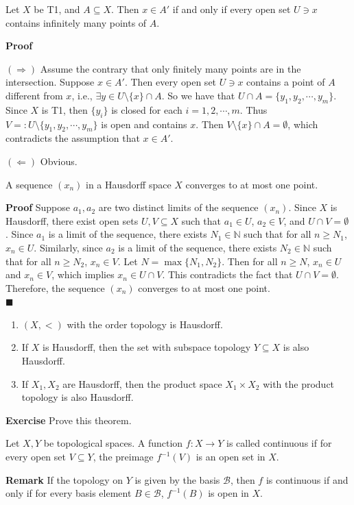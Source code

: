 \documentclass[main.tex]{subfiles}
\begin{document}
\begin{theorem}
    Let $X$ be T1, and $A \subseteq X$. Then $x \in A'$ if and only if every open set $U \ni x$ contains infinitely many points of $A$.
\end{theorem}
\par \noindent \textbf{Proof} 
\par $(\Rightarrow)$ Assume the contrary that only finitely many points are in the intersection. Suppose $x \in A'$. Then every open set $U \ni x$ contains a point of $A$ different from $x$, i.e., $\exists y\in U\setminus \{x\} \cap A$. So we have that $U\cap A = \{y_1, y_2, \cdots, y_m\}$. Since $X$ is T1, then $\{y_i\}$ is closed for each $i = 1, 2, \cdots, m$. Thus $V=:U \setminus \{y_1, y_2, \cdots, y_m\}$ is open and contains $x$. Then $V\setminus \{x\} \cap A = \emptyset$, which contradicts the assumption that $x \in A'$. 
\par $(\Leftarrow)$ Obvious.

\begin{theorem}
    A sequence $(x_n)$ in a Hausdorff space $X$ converges to at most one point.
\end{theorem}
\par \noindent \textbf{Proof} Suppose $a_1, a_2$ are two distinct limits of the sequence $(x_n)$. Since $X$ is Hausdorff, there exist open sets $U, V \subseteq X$ such that $a_1 \in U$, $a_2 \in V$, and $U \cap V = \emptyset$. Since $a_1$ is a limit of the sequence, there exists $N_1 \in \mathbb{N}$ such that for all $n \geq N_1$, $x_n \in U$. Similarly, since $a_2$ is a limit of the sequence, there exists $N_2 \in \mathbb{N}$ such that for all $n \geq N_2$, $x_n \in V$. Let $N = \max\{N_1, N_2\}$. Then for all $n \geq N$, $x_n \in U$ and $x_n \in V$, which implies $x_n \in U \cap V$. This contradicts the fact that $U \cap V = \emptyset$. Therefore, the sequence $(x_n)$ converges to at most one point.
\mbox{} \\ \null \hfill $\blacksquare$ 

\begin{theorem}
    \begin{enumerate}
        \item $(X, <)$ with the order topology is Hausdorff.
        \item If $X$ is Hausdorff, then the set with subspace topology $Y \subseteq X$ is also Hausdorff.
        \item If $X_1, X_2$ are Hausdorff, then the product space $X_1 \times X_2$ with the product topology is also Hausdorff.
    \end{enumerate}
\end{theorem}
\par \noindent \textbf{Exercise} Prove this theorem. 
\begin{definition}
    Let $X, Y$ be topological spaces. A function $f: X \to Y$ is called continuous if for every open set $V \subseteq Y$, the preimage $f^{-1}(V)$ is an open set in $X$. 
\end{definition}
\par \noindent \textbf{Remark} If the topology on $Y$ is given by the basis $\mathcal{B}$, then $f$ is continuous if and only if for every basis element $B \in \mathcal{B}$, $f^{-1}(B)$ is open in $X$. 
\end{document}
